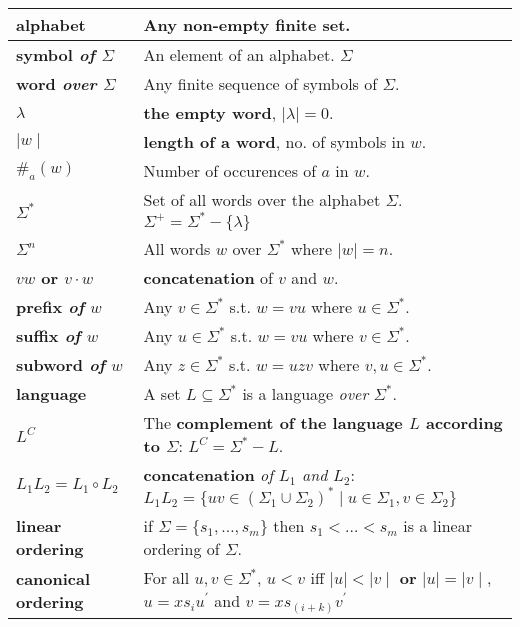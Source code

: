 \begin{tabu} to 
  alphabet \norm{($\Sigma$)} & Any non-empty finite set.\\ \hline
  symbol {\it of $\Sigma$} & An element of an alphabet.
  $\Sigma$\\ \hline
  word {\it over $\Sigma$} & Any finite sequence of symbols of $\Sigma$.
  \\ \hline
  $\lambda$ & {\bf the empty word}, $\mid\lambda\mid = 0$. \\ \hline
  $\mid w \mid$ & {\bf length of a word}, no. of symbols in $w$. \\ \hline
  $\#_a(w)$ & Number of occurences of $a$ in $w$. \\ \hline
  $\Sigma^*$ & Set of all words over the alphabet $\Sigma$. \newline
  $\Sigma^+ = \Sigma^* - \{\lambda\}$ \\ \hline
  $\Sigma^n$ & All words $w$ over $\Sigma^*$ where $\mid w \mid = n$.
  \\ \hline
  $vw$ or $v \cdot w$ & {\bf concatenation} of $v$ and $w$. \\ \hline
  prefix {\it of} $w$ & Any $v \in \Sigma^*$ s.t. $w = vu$ where $u \in \Sigma^*$.
  \\ \hline
  suffix {\it of} $w$ & Any $u \in \Sigma^*$ s.t. $w = vu$ where $v \in \Sigma^*$.
  \\ \hline
  subword {\it of} $w$ & Any $z \in \Sigma^*$ s.t. $w = uzv$ where  $v, u \in
  \Sigma^*$. \\ \hline
  language  & A set $L \subseteq \Sigma^*$ is a language {\it over}
  $\Sigma^*$. \\ \hline
  $L^C$ & The {\bf complement of the language $L$ according to $\Sigma$}:
  $L^C = \Sigma^* - L$. \\ \hline
  $L_1L_2 = L_1 \circ L_2$ & {\bf concatenation} {\it of $L_1$ and $L_2$}: \newline
  $L_1L_2 = \{uv \in \left(\Sigma_1 \cup \Sigma_2 \right)^* \mid u \in \Sigma_1,
  v \in \Sigma_2\}$ \\ \hline
  linear \newline ordering & if $\Sigma = \{s_1, \ldots, s_m\}$ then
  $s_1 < \ldots < s_m$ is a linear ordering of $\Sigma$. \\ \hline
  canonical \newline ordering & For all $u,v \in \Sigma^*$, $u < v$ iff $\mid u
  \mid < \mid v \mid$ {\bf or} $\mid u \mid = \mid v \mid$, $u = xs_iu^\prime$
  and $v = xs_{(i+k)}v^\prime$ \\ \hline

\end{tabu}
